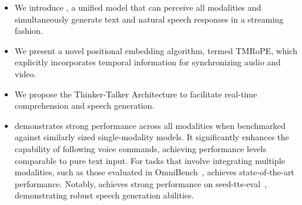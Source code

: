 \begin{itemize}
    \item  We introduce \method, a unified model that can perceive all modalities and simultaneously generate text and natural speech responses in a streaming fashion.
    \item We present a novel positional embedding algorithm, termed TMRoPE, which explicitly incorporates temporal information for synchronizing audio and video.
    \item We propose the Thinker-Talker Architecture to facilitate real-time comprehension and speech generation.
    \item \method demonstrates strong performance across all modalities when benchmarked against similarly sized single-modality models. It significantly enhances the capability of following voice commands, achieving performance levels comparable to pure text input. For tasks that involve integrating multiple modalities, such as those evaluated in OmniBench~\citep{li2024omnibench}, \method achieves state-of-the-art performance. Notably, \method achieves strong performance on seed-tts-eval~\citep{seedtts}, demonstrating robust speech generation abilities.
\end{itemize}
